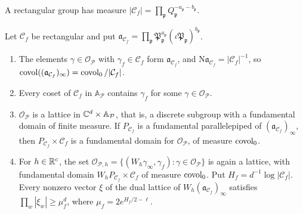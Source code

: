A rectangular group has measure
$|\mathcal C_f|=\prod_{\mathfrak p}Q_{\mathfrak p}^{-a_{\mathfrak
p}-b_{\mathfrak p}}$.

\begin{lemma}\label{fw:lattice}
Let $\mathcal C_f$ be rectangular and put
$\mathfrak a_{\mathcal C_f}=\prod_{\mathfrak p}\mathfrak P_{\mathfrak p}^{a_{\mathfrak
p}}(\iota\mathfrak P_{\mathfrak p})^{b_{\mathfrak p}}$.
\begin{enumerate}
\item[(a)] The elements $\gamma\in\mathcal O_{\mathcal P}$ with $\gamma_f\in\mathcal C_f$
form $\mathfrak a_{\mathcal C_f}$, and $\mathrm N\mathfrak a_{\mathcal C_f}=|\mathcal C_f|^{-1}$, so
$\operatorname{covol}((\mathfrak a_{\mathcal C_f})_\infty)=\operatorname{covol}_0/|\mathcal C_f|$.
\item[(b)] Every coset of $\mathcal C_f$ in $\mathbb A_{\mathcal P}$
contains $\gamma_f$ for some $\gamma\in\mathcal O_{\mathcal P}$.
\item[(c)] $\mathcal O_{\mathcal P}$ is a lattice in $\mathbb C^d\times\mathbb A_{\mathcal P}$,
that is, a discrete subgroup with a fundamental domain of finite
measure. If $P_{\mathcal C_f}$ is a fundamental parallelepiped of
$(\mathfrak a_{\mathcal C_f})_\infty$, then $P_{\mathcal C_f}\times\mathcal C_f$ is a
fundamental domain for $\mathcal O_{\mathcal P}$, of measure $\operatorname{covol}_0$.
\item[(d)] For $h\in\mathbb R^c$, the set
$\mathcal O_{\mathcal P,h}=\{(W_h\gamma_\infty,\gamma_f):\gamma\in\mathcal
O_{\mathcal P}\}$ is again a lattice, with fundamental domain $W_hP_{\mathcal C_f}\times\mathcal C_f$
of measure $\operatorname{covol}_0$. Put $H_f=d^{-1}\log|\mathcal C_f|$. Every nonzero
vector $\xi$ of the dual lattice of $W_h(\mathfrak a_{\mathcal C_f})_\infty$ satisfies
$\prod_w|\xi_w|\ge\mu_f^d$, where $\mu_f=2e^{H_f/2-\ell}$.
\end{enumerate}
\end{lemma}

